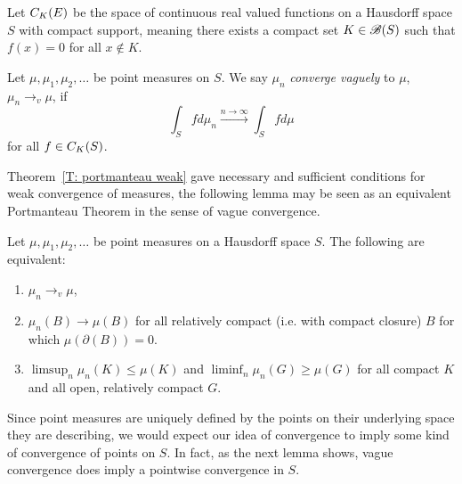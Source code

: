 \begin{definition} \label{D: vague convergence}
	Let $C_K(E)$ be the space of continuous real valued functions on a Hausdorff space $S$ with compact support,
	meaning there exists a compact set $K \in \mathscr{B}(S)$ such that $f(x) = 0$ for all $x \notin K$.
	
	Let $\mu, \mu_1, \mu_2, \dots$ be point measures on $S$.
	We say $\mu_n$ \emph{converge vaguely} to $\mu$, $\mu_n \rightarrow_v \mu$, if
	\begin{equation}
		\int_{S} fd\mu_n \xrightarrow{n \rightarrow \infty} \int_{S} fd\mu
	\end{equation}
	for all $f \in C_K(S)$.
\end{definition}

Theorem~\ref{T: portmanteau weak} gave necessary and sufficient conditions for weak convergence of measures,
the following lemma may be seen as an equivalent Portmanteau Theorem in the sense of vague convergence.

\begin{lemma} \label{L: portmanteau vague}
	Let $\mu, \mu_1, \mu_2, \dots$ be point measures on a Hausdorff space $S$.
	The following are equivalent:
	\begin{enumerate}
		\item $\mu_n \rightarrow_v \mu$,
		\item $\mu_n(B) \rightarrow \mu(B)$ for all relatively compact (i.e. with compact closure) $B$ 
			for which $\mu(\partial(B)) = 0$.
		\item $\limsup_n \mu_n(K) \leq \mu(K)$ and $\liminf_n \mu_n(G) \geq \mu(G)$
			for all compact $K$ and all open, relatively compact $G$.
	\end{enumerate}
\end{lemma}

Since point measures are uniquely defined by the points on their underlying space they are describing,
we would expect our idea of convergence to imply some kind of convergence of points on $S$.
In fact, as the next lemma shows, vague convergence does imply a pointwise convergence in $S$.


